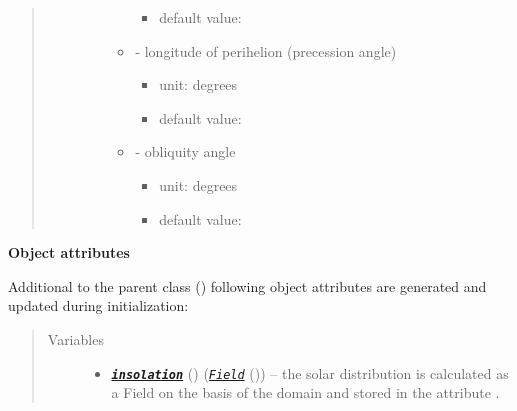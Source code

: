\documentclass[a4paper,10pt,english]{sphinxmanual}
\begin{document}
\begin{fulllineitems}
\begin{quote}
\begin{description}
\begin{itemize}
\begin{itemize}
\begin{itemize}
\item {} 
default value: 

\end{itemize}

\item {} 
 - longitude of perihelion (precession angle)
\begin{itemize}
\item {} 
unit: degrees

\item {} 
default value: 

\end{itemize}

\item {} 
 - obliquity angle
\begin{itemize}
\item {} 
unit: degrees

\item {} 
default value: 

\end{itemize}

\end{itemize}


\end{itemize}

\end{description}\end{quote}

\textbf{Object attributes}

Additional to the parent class {\hyperref[api/climlab.radiation:climlab.radiation.insolation._Insolation]{\emph{}}} ()
following object attributes are generated and updated during initialization:
\begin{quote}\begin{description}
\item[{Variables}] \leavevmode\begin{itemize}
\item {} 
{\hyperref[api/climlab.radiation:climlab.radiation.insolation.P2Insolation.insolation]{\emph{\textbf{\texttt{insolation}}}}} () ({\hyperref[api/climlab.domain:climlab.domain.field.Field]{\emph{\emph{\texttt{Field}}}}} ()) -- the solar distribution is calculated as a Field on 
the basis of the  domain
and stored in the attribute .


\end{itemize}
\end{description}
\end{quote}
\end{fulllineitems}
\end{document}
